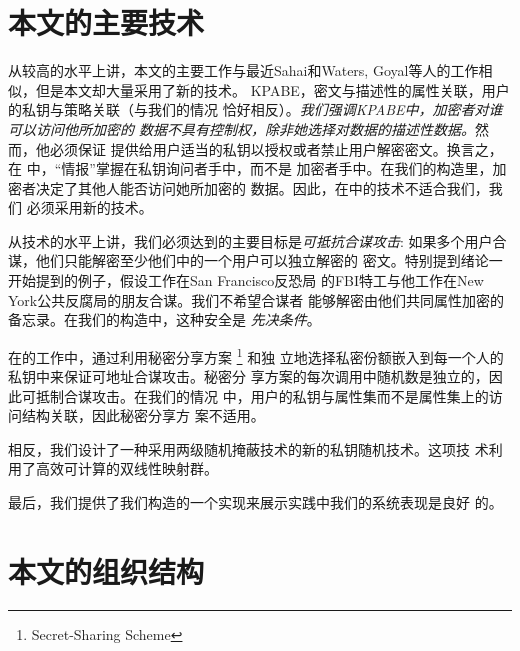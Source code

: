 \section{本文的主要技术}
从较高的水平上讲，本文的主要工作与最近Sahai和Waters\cite{SW:FuzzyIBE},
Goyal等人\cite{GPSW:ABE}的工作相似，但是本文却大量采用了新的技术。
KPABE，密文与描述性的属性关联，用户的私钥与策略关联（与我们的情况
恰好相反）。\textit{我们强调KPABE中，加密者对谁可以访问他所加密的
数据不具有控制权，除非她选择对数据的描述性数据。}然而，他必须保证
提供给用户适当的私钥以授权或者禁止用户解密密文。换言之，在
\cite{SW:FuzzyIBE,GPSW:ABE}中，“情报”掌握在私钥询问者手中，而不是
加密者手中。在我们的构造里，加密者决定了其他人能否访问她所加密的
数据。因此，在\cite{SW:FuzzyIBE,GPSW:ABE}中的技术不适合我们，我们
必须采用新的技术。\par
从技术的水平上讲，我们必须达到的主要目标是\textit{可抵抗合谋攻击}:
如果多个用户合谋，他们只能解密至少他们中的一个用户可以独立解密的
密文。特别提到绪论一开始提到的例子，假设工作在San Francisco反恐局
的FBI特工与他工作在New York公共反腐局的朋友合谋。我们不希望合谋者
能够解密由他们共同属性加密的备忘录。在我们的构造中，这种安全是
\textit{先决条件}。\par
在\cite{SW:FuzzyIBE,GPSW:ABE}的工作中，通过利用秘密分享方案
\footnote{Secret-Sharing Scheme} \cite{Shamir:SSS,Blakley:SSS}和独
立地选择私密份额嵌入到每一个人的私钥中来保证可地址合谋攻击。秘密分
享方案的每次调用中随机数是独立的，因此可抵制合谋攻击。在我们的情况
中，用户的私钥与属性集而不是属性集上的访问结构关联，因此秘密分享方
案不适用。\par
相反，我们设计了一种采用两级随机掩蔽技术的新的私钥随机技术。这项技
术利用了高效可计算的双线性映射群。\par
最后，我们提供了我们构造的一个实现来展示实践中我们的系统表现是良好
的。
\section{本文的组织结构}

